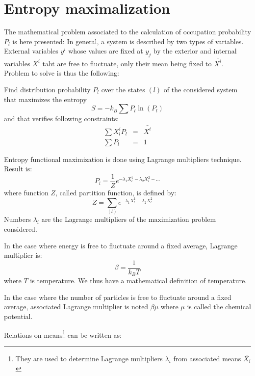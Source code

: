 \documentclass[12pt]{book}
\begin{document}
\section{Entropy maximalization}\label{secmaxient}
The mathematical problem associated to the calculation of occupation
probability $P_l$ is here presented:
In general, a system is described by two types of variables. External
variables $y^i$ whose values are fixed at $y_j$ by the exterior and internal
variables $X^i$ taht are free to fluctuate, only their mean being fixed to
$\bar{X^i}$. Problem to solve is thus the following:
\begin{prob}
Find distribution probability $P_l$ over the states $(l)$ of the
considered system 
that maximizes the entropy
\begin{equation}
S=-k_B\sum P_l \ln (P_l)
\end{equation}
and that verifies following constraints:
\begin{eqnarray}
\sum X_{l}^iP_l&=&\bar{X^i}\\
\sum P_l&=&1
\end{eqnarray}
\end{prob}
Entropy functional maximization is done using Lagrange multipliers
technique. Result is:
\begin{equation}
P_l=\frac{1}{Z}e^{-\lambda_1 X^{1}_l-\lambda_2 X^{2}_l- ...}
\end{equation}
where function $Z$, called partition function,
is
defined by:
\begin{equation}
Z=\sum_{(l)} e^{-\lambda_1 X^{1}_l-\lambda_2 X^{2}_l- ...}
\end{equation}
Numbers $\lambda_i$ are the Lagrange multipliers of the maximization problem
considered.
\begin{exmp}
In the case where energy is free to fluctuate around a fixed average, Lagrange
multiplier is:
\begin{equation}
\beta=\frac{1}{k_BT}
\end{equation}
where $T$ is temperature. We thus have a mathematical
definition of temperature.
\end{exmp}
\begin{exmp}
In the case where the number of particles is free to fluctuate around a fixed
average, associated Lagrange multiplier is noted $\beta\mu$ where $\mu$ is
called the chemical potential.
\end{exmp}
Relations on means\footnote{They are used to determine Lagrange multipliers
$\lambda_i$ from associated means $\bar{X_i}$} can be written as:
\end{document}
